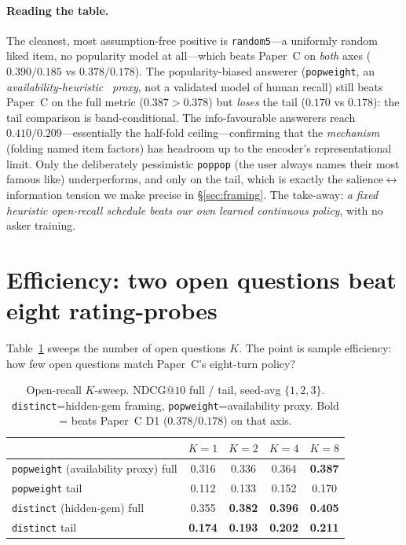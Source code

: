 \documentclass[11pt]{article}
\makeatletter
\newcommand{\ndcg}{\mathrm{NDCG@}10}
\makeatother
\begin{document}
\paragraph{Reading the table.} The cleanest, most assumption-free positive is \texttt{random5}---a uniformly random
liked item, no popularity model at all---which beats Paper~C on \emph{both} axes ($0.390/0.185$ vs $0.378/0.178$).
The popularity-biased answerer (\texttt{popweight}, an \emph{availability-heuristic}~\cite{tversky73} \emph{proxy}, not a validated model of
human recall) still beats Paper~C on the full metric ($0.387 > 0.378$) but \emph{loses} the tail ($0.170$ vs
$0.178$): the tail comparison is band-conditional. The info-favourable
answerers reach $0.410/0.209$---essentially the half-fold ceiling---confirming that the \emph{mechanism} (folding named
item factors) has headroom up to the encoder's representational limit. Only the deliberately pessimistic
\texttt{poppop} (the user always names their most famous like) underperforms, and only on the tail, which is exactly
the salience$\leftrightarrow$information tension we make precise in \S\ref{sec:framing}. The take-away: \emph{a fixed
heuristic open-recall schedule beats our own learned continuous policy}, with no asker training.

\section{Efficiency: two open questions beat eight rating-probes}
\label{sec:efficiency}
Table~\ref{tab:kcurve} sweeps the number of open questions $K$. The point is sample efficiency: how few open questions
match Paper~C's eight-turn policy?

\begin{table}[t]
\centering
\caption{Open-recall $K$-sweep. $\ndcg$ full / tail, seed-avg $\{1,2,3\}$. \texttt{distinct}=hidden-gem framing,
\texttt{popweight}=availability proxy. Bold = beats Paper~C D1 ($0.378/0.178$) on that axis.}
\label{tab:kcurve}
\begin{tabular}{lcccc}
\toprule
 & $K{=}1$ & $K{=}2$ & $K{=}4$ & $K{=}8$ \\
\midrule
\texttt{popweight} (availability proxy) full & 0.316 & 0.336 & 0.364 & \textbf{0.387} \\
\texttt{popweight} tail             & 0.112 & 0.133 & 0.152 & 0.170 \\
\texttt{distinct} (hidden-gem) full & 0.355 & \textbf{0.382} & \textbf{0.396} & \textbf{0.405} \\
\texttt{distinct} tail              & \textbf{0.174} & \textbf{0.193} & \textbf{0.202} & \textbf{0.211} \\
\bottomrule
\end{tabular}
\end{table}
\end{document}
